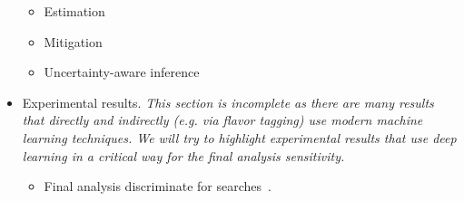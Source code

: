 \documentclass[12pt,letterpaper]{article}
\begin{document}
\begin{itemize}
\begin{itemize}
		\item Estimation~\cite{Nachman:2019dol,Nachman:2019yfl,Barnard:2016qma}
		\item Mitigation~\cite{Estrade:DLPS2017,Englert:2018cfo,Louppe:2016ylz}
		\item Uncertainty-aware inference~\cite{Caron:2019xkx,Bollweg:2019skg,deCastro:2018mgh,Wunsch:2020iuh}
	\end{itemize}
\item Experimental results. \textit{This section is incomplete as there are many results that directly and indirectly (e.g. via flavor tagging) use modern machine learning techniques.  We will try to highlight experimental results that use deep learning in a critical way for the final analysis sensitivity.}
	\begin{itemize}
		\item Final analysis discriminate for searches~\cite{Aad:2019yxi,Aad:2020hzm,collaboration2020dijet,Sirunyan:2020hwz}.
	\end{itemize}


\end{itemize}


\clearpage
\flushbottom
%


\end{document}
